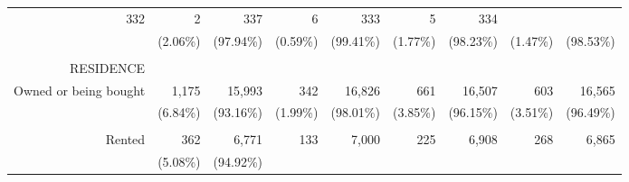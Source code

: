 \documentclass{article}
\begin{document}
\begin{table}[!h]
{\begin{tabular}{lllllllll}
			\multicolumn{1}{r}{332} &
			\multicolumn{1}{r}{2} &
			\multicolumn{1}{r}{337} &
			\multicolumn{1}{r}{6} &
			\multicolumn{1}{r}{333} &
			\multicolumn{1}{r}{5} &
			\multicolumn{1}{r}{334} \\
			\multicolumn{1}{r}{} &
			\multicolumn{1}{|r}{(2.06\%)} &
			\multicolumn{1}{r}{(97.94\%)} &
			\multicolumn{1}{r}{(0.59\%)} &
			\multicolumn{1}{r}{(99.41\%)} &
			\multicolumn{1}{r}{(1.77\%)} &
			\multicolumn{1}{r}{(98.23\%)} &
			\multicolumn{1}{r}{(1.47\%)} &
			\multicolumn{1}{r}{(98.53\%)} \\
			\multicolumn{1}{r}{} &
			\multicolumn{1}{|r}{} &
			\multicolumn{1}{r}{} &
			\multicolumn{1}{r}{} &
			\multicolumn{1}{r}{} &
			\multicolumn{1}{r}{} &
			\multicolumn{1}{r}{} &
			\multicolumn{1}{r}{} &
			\multicolumn{1}{r}{} \\
			\multicolumn{1}{r}{RESIDENCE} &
			\multicolumn{1}{|r}{} &
			\multicolumn{1}{r}{} &
			\multicolumn{1}{r}{} &
			\multicolumn{1}{r}{} &
			\multicolumn{1}{r}{} &
			\multicolumn{1}{r}{} &
			\multicolumn{1}{r}{} &
			\multicolumn{1}{r}{} \\
			\multicolumn{1}{r}{Owned or being bought\hspace{1em}} &
			\multicolumn{1}{|r}{1,175} &
			\multicolumn{1}{r}{15,993} &
			\multicolumn{1}{r}{342} &
			\multicolumn{1}{r}{16,826} &
			\multicolumn{1}{r}{661} &
			\multicolumn{1}{r}{16,507} &
			\multicolumn{1}{r}{603} &
			\multicolumn{1}{r}{16,565} \\
			\multicolumn{1}{r}{} &
			\multicolumn{1}{|r}{(6.84\%)} &
			\multicolumn{1}{r}{(93.16\%)} &
			\multicolumn{1}{r}{(1.99\%)} &
			\multicolumn{1}{r}{(98.01\%)} &
			\multicolumn{1}{r}{(3.85\%)} &
			\multicolumn{1}{r}{(96.15\%)} &
			\multicolumn{1}{r}{(3.51\%)} &
			\multicolumn{1}{r}{(96.49\%)} \\
			\multicolumn{1}{r}{} &
			\multicolumn{1}{|r}{} &
			\multicolumn{1}{r}{} &
			\multicolumn{1}{r}{} &
			\multicolumn{1}{r}{} &
			\multicolumn{1}{r}{} &
			\multicolumn{1}{r}{} &
			\multicolumn{1}{r}{} &
			\multicolumn{1}{r}{} \\
			\multicolumn{1}{r}{Rented\hspace{1em}} &
			\multicolumn{1}{|r}{362} &
			\multicolumn{1}{r}{6,771} &
			\multicolumn{1}{r}{133} &
			\multicolumn{1}{r}{7,000} &
			\multicolumn{1}{r}{225} &
			\multicolumn{1}{r}{6,908} &
			\multicolumn{1}{r}{268} &
			\multicolumn{1}{r}{6,865} \\
			\multicolumn{1}{r}{} &
			\multicolumn{1}{|r}{(5.08\%)} &
			\multicolumn{1}{r}{(94.92\%)} &

\end{tabular}}
\end{table}
\end{document}
